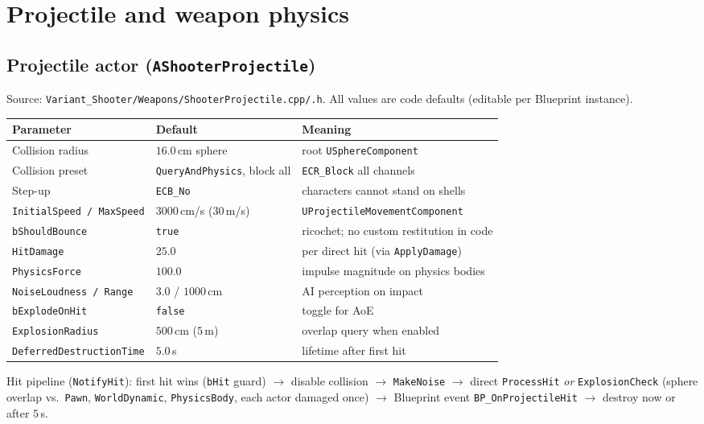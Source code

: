 \documentclass[11pt,a4paper]{article}
\begin{document}
\section{Projectile and weapon physics}
\label{sec:projectile}

\subsection{Projectile actor (\texttt{AShooterProjectile})}
Source: \texttt{Variant\_Shooter/Weapons/ShooterProjectile.cpp/.h}. All values are code defaults (editable per Blueprint instance).

\begin{center}
\begin{tabular}{@{}lll@{}}
\toprule
Parameter & Default & Meaning \\
\midrule
Collision radius & $16.0$\,cm sphere & root \texttt{USphereComponent} \\
Collision preset & \texttt{QueryAndPhysics}, block all & \texttt{ECR\_Block} all channels \\
Step-up & \texttt{ECB\_No} & characters cannot stand on shells \\
\texttt{InitialSpeed / MaxSpeed} & $3000$\,cm/s ($30$\,m/s) & \texttt{UProjectileMovementComponent} \\
\texttt{bShouldBounce} & \texttt{true} & ricochet; no custom restitution in code \\
\texttt{HitDamage} & $25.0$ & per direct hit (via \texttt{ApplyDamage}) \\
\texttt{PhysicsForce} & $100.0$ & impulse magnitude on physics bodies \\
\texttt{NoiseLoudness / Range} & $3.0$ / $1000$\,cm & AI perception on impact \\
\texttt{bExplodeOnHit} & \texttt{false} & toggle for AoE \\
\texttt{ExplosionRadius} & $500$\,cm ($5$\,m) & overlap query when enabled \\
\texttt{DeferredDestructionTime} & $5.0$\,s & lifetime after first hit \\
\bottomrule
\end{tabular}
\end{center}

Hit pipeline (\texttt{NotifyHit}): first hit wins (\texttt{bHit} guard) $\rightarrow$ disable collision $\rightarrow$ \texttt{MakeNoise} $\rightarrow$ direct \texttt{ProcessHit} \emph{or} \texttt{ExplosionCheck} (sphere overlap vs.\ \texttt{Pawn}, \texttt{WorldDynamic}, \texttt{PhysicsBody}, each actor damaged once) $\rightarrow$ Blueprint event \texttt{BP\_OnProjectileHit} $\rightarrow$ destroy now or after $5$\,s.
\end{document}
